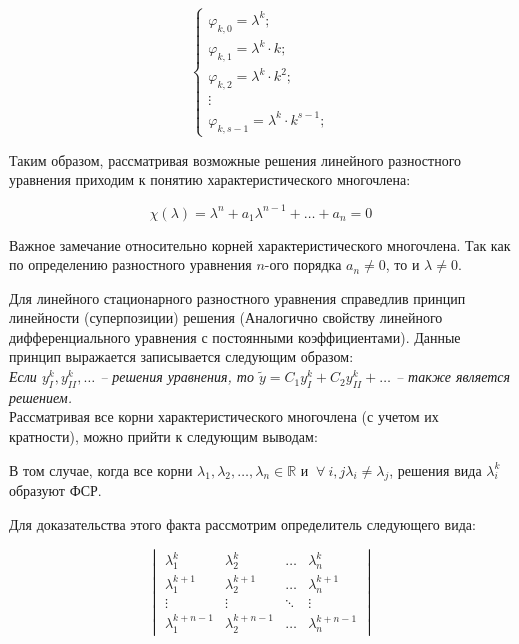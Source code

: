 \documentclass[10pt,a4paper]{article}
\begin{document}
	\begin{equation}
		\begin{cases}
			\varphi_{k, 0} = \lambda^{k};
			\\
			\varphi_{k, 1} = \lambda^{k}\cdot k;
			\\
			\varphi_{k, 2} = \lambda^{k}\cdot k^{2};
			\\
			\vdots
			\\
			\varphi_{k, s - 1} = \lambda^{k}\cdot k^{s - 1};
		\end{cases}
	\end{equation}
	
	Таким образом, рассматривая возможные решения линейного разностного 
	уравнения приходим к понятию характеристического многочлена:
	
	\begin{equation}
		\chi\left(\lambda\right) = 
		\lambda^{n} + a_{1}\lambda^{n - 1} + \ldots + a_{n} = 0
	\end{equation}
	
	Важное замечание относительно корней характеристического многочлена. Так как
	по определению разностного уравнения $n$-ого порядка $a_{n} \neq 0$, то и 
	$\lambda \neq 0$.
	
	Для линейного стационарного разностного уравнения справедлив принцип 
	линейности (суперпозиции) решения (Аналогично свойству линейного 
	дифференциального уравнения с постоянными коэффициентами). Данные принцип 
	выражается записывается следующим образом:\\
	
	\textit{Если $y^{k}_{I}, y^{k}_{II}, \ldots$ -- решения уравнения, то 
	$\widetilde{y} = C_{1}y^{k}_{I} + C_{2}y^{k}_{II} + \ldots$ -- также 
	является решением.}\\
	
	Рассматривая все корни характеристического многочлена (с учетом их 
	кратности), можно прийти к следующим выводам:
	
	В том случае, когда все корни $\lambda_{1}, \lambda_{2}, \ldots, \lambda_{n}
	\in \mathbb{R} $ и  $\ \forall \ i, j \lambda_{i} \neq \lambda_{j}$, решения
	вида $\lambda_{i}^{k}$ образуют ФСР.
	
	Для доказательства этого факта рассмотрим определитель следующего вида:
	
	\begin{equation}
		\begin{vmatrix}
			\lambda_{1}^{k} & \lambda_{2}^{k} & \ldots & \lambda_{n}^{k} \\
			\lambda_{1}^{k + 1} & \lambda_{2}^{k + 1} & \ldots & 
			\lambda_{n}^{k + 1} \\
			\vdots & \vdots & \ddots & \vdots \\
			\lambda_{1}^{k + n - 1} & \lambda_{2}^{k + n - 1} & \ldots &
			\lambda_{n}^{k + n - 1}
		\end{vmatrix}
	\end{equation}
	
\end{document}
